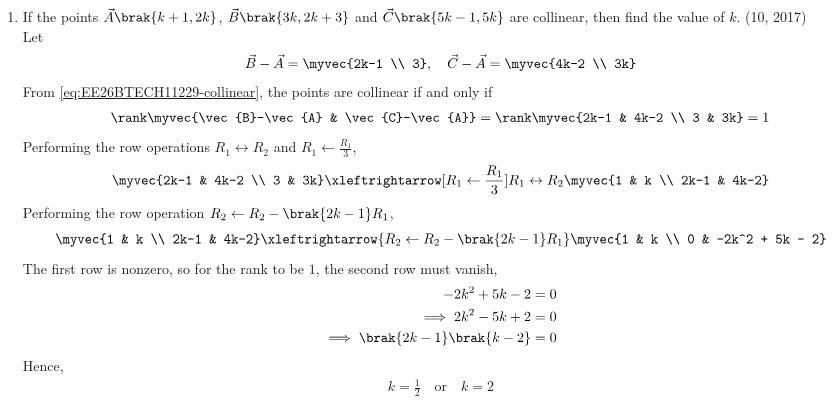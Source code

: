 \begin{enumerate}[label=\thesubsection.\arabic*, ref=\thesubsection.\theenumi]
Since $n \ge 0$,
\begin{align}
	n = 11
\end{align}
Hence, the number of terms is $n + 1 = 12$.
The following code verifies the solution
\begin{lstlisting}[frame=single, basicstyle=\rmfamily, escapeinside={(*@}{@*)}]
(*@\makebox[\dimexpr\linewidth-2\fboxsep-2\fboxrule\relax][c]{codes/ap\_sum.c}@*)
\end{lstlisting}
\item 
If the points $\vec{A}\brak{k+1, 2k}$, $\vec{B}\brak{3k, 2k+3}$ and $\vec{C}\brak{5k-1, 5k}$ are collinear, then find the value of $k$.
\hfill (10, 2017)
\\
\solution
Let
\begin{align}
	\vec{B} - \vec{A} = \myvec{2k-1 \\ 3}, \quad \vec{C} - \vec{A} = \myvec{4k-2 \\ 3k}
\end{align}
From \eqref{eq:EE26BTECH11229-collinear}, the points are collinear if and only if
\begin{align}
	\rank\myvec{\vec{B}-\vec{A} & \vec{C}-\vec{A}} = \rank\myvec{2k-1 & 4k-2 \\ 3 & 3k} = 1
\end{align}
Performing the row operations $R_1 \leftrightarrow R_2$ and $R_1 \leftarrow \frac{R_1}{3}$,
\begin{align}
	\myvec{2k-1 & 4k-2 \\ 3 & 3k} \xleftrightarrow[R_1 \leftarrow \frac{R_1}{3}]{R_1 \leftrightarrow R_2} \myvec{1 & k \\ 2k-1 & 4k-2}
\end{align}
Performing the row operation $R_2 \leftarrow R_2 - \brak{2k-1}R_1$,
\begin{align}
	\myvec{1 & k \\ 2k-1 & 4k-2} \xleftrightarrow{R_2 \leftarrow R_2 - \brak{2k-1}R_1} \myvec{1 & k \\ 0 & -2k^2 + 5k - 2}
\end{align}
The first row is nonzero, so for the rank to be $1$, the second row must vanish,
\begin{align}
	-2k^2 + 5k - 2 &= 0
	\\
	\implies 2k^2 - 5k + 2 &= 0
	\\
	\implies \brak{2k-1}\brak{k-2} &= 0
\end{align}
Hence,
\begin{align}
	k = \frac{1}{2} \quad \text{or} \quad k = 2
\end{align}

\end{enumerate}

